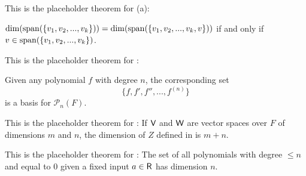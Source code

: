 \begin{additional theorem} \label{athm 1.23}
This is the placeholder theorem for (a):

\(\dim(\operatorname{span}(\{ v_1, v_2, ..., v_k \})) = \dim(\operatorname{span}(\{ v_1, v_2, ..., v_k, v \}))\) if and only if \(v \in \operatorname{span}(\{ v_1, v_2, ..., v_k \})\).
\end{additional theorem}

\begin{additional theorem} \label{athm 1.24}
This is the placeholder theorem for :

Given any polynomial \(f\) with degree \(n\), the corresponding set
\[
    \{ f, f', f'', ..., f^{(n)} \}
\]
is a basis for \(\mathcal{P}_n(F)\).
\end{additional theorem}

\begin{additional theorem} \label{athm 1.25}
This is the placeholder theorem for :
If \(\textsf{V}\) and \(\textsf{W}\) are vector spaces over \(F\) of dimensions \(m\) and \(n\), the dimension of \(Z\) defined in  is \(m + n\).
\end{additional theorem}

\begin{additional theorem} \label{athm 1.26}
This is the placeholder theorem for :
The set of all polynomials with degree \(\le n\) and equal to \(0\) given a fixed input \(a \in \textsf{R}\) has dimension \(n\).
\end{additional theorem}

